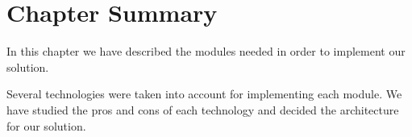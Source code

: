 \section{Chapter Summary}
\label{architecture:summary}

In this chapter we have described the modules needed in order to implement our solution.

Several technologies were taken into account for implementing each module. We have studied the pros and cons of each technology and decided the architecture for our solution.


